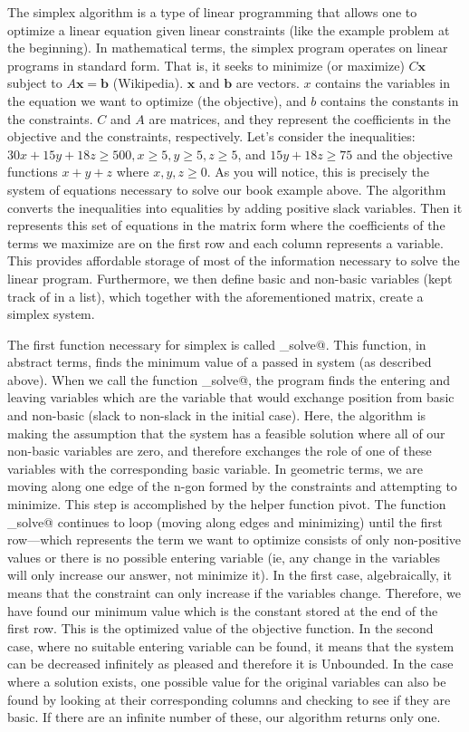 \documentclass[letterpaper,12pt]{article}
\newcommand{\vect}[1]{\mathbf{#1}}
\begin{document}
The simplex algorithm is a type of linear programming that allows one to
optimize a linear equation given linear constraints (like the example problem at
the beginning). In mathematical terms, the simplex program operates on linear
programs in standard form. That is, it seeks to minimize (or maximize)
$C\vect{x}$ subject to $A\vect{x} = \vect{b} $ (Wikipedia). $\vect{x}$ and
$\vect{b}$ are vectors. $x$ contains the variables in the equation we want to
optimize (the objective), and $b$ contains the constants in the constraints. $C$
and $A$ are matrices, and they represent the coefficients in the objective and
the constraints, respectively. Let's consider the inequalities: $30x + 15y + 18z
\geq 500, x \geq 5,y \geq 5, z \geq 5$, and $15y+18z \geq 75$ and the objective
functions $x +y + z$ where $x, y, z \geq 0$. As you will notice, this is
precisely the system of equations necessary to solve our book example above. The
algorithm converts the inequalities into equalities by adding positive slack
variables. Then it represents this set of equations in the matrix form where the
coefficients of the terms we maximize are on the first row and each column
represents a variable. This provides affordable storage of most of the
information necessary to solve the linear program.  Furthermore, we then define
basic and non-basic variables (kept track of in a list), which together with the
aforementioned matrix, create a simplex system.

The first function necessary for simplex is called \verb@simple_solve@. This
function, in abstract terms, finds the minimum value of a passed in system (as
described above). When we call the function \verb@simple_solve@, the program
finds the entering and leaving variables which are the variable that would
exchange position from basic and non-basic (slack to non-slack in the initial
case). Here, the algorithm is making the assumption that the system has a
feasible solution where all of our non-basic variables are zero, and therefore
exchanges the role of one of these variables with the corresponding basic
variable. In geometric terms, we are moving along one edge of the n-gon formed
by the constraints and attempting to minimize. This step is accomplished by the
helper function pivot. The function \verb@simple_solve@ continues to loop
(moving along edges and minimizing) until the first row---which represents the
term we want to optimize consists of only non-positive values or there is no
possible entering variable (ie, any change in the variables will only increase
our answer, not minimize it). In the first case, algebraically, it means that
the constraint can only increase if the variables change. Therefore, we have
found our minimum value which is the constant stored at the end of the first
row. This is the optimized value of the objective function. In the second case,
where no suitable entering variable can be found, it means that the system can
be decreased infinitely as pleased and therefore it is Unbounded. In the case
where a solution exists, one possible value for the original variables can also
be found by looking at their corresponding columns and checking to see if they
are basic. If there are an infinite number of these, our algorithm returns only
one. 
\end{document}
